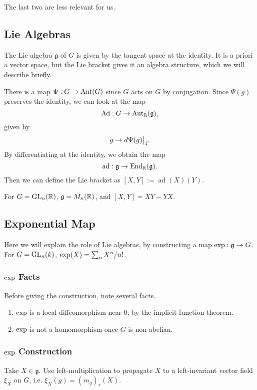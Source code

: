 The last two are less relevant for us.

\subsection{Lie Algebras}
The Lie algebra $\mathfrak{g}$ of $G$ is given by the tangent space at the 
identity. It is a priori a vector space, but the Lie bracket gives it an algebra
structure, which we will describe briefly.

There is a map $\Psi: G \rightarrow \operatorname{Aut}(G)$ since $G$ acts on $G$ by 
conjugation. Since $\Psi(g)$ preserves the identity, we can look at the map
\[ \operatorname{Ad}: G \rightarrow \operatorname{Aut}_{\mathbb{R}}(\mathfrak{g}), \]
given by \[ g \rightarrow \restr{d\Psi(g)}{1}.\] By differentiating at the 
identity, we obtain the map
\[ \operatorname{ad}: \mathfrak{g} \rightarrow \operatorname{End}_{\mathbb{R}}(\mathfrak{g}). \]
Then we can define the Lie bracket as $[X, Y] := \operatorname{ad}(X)(Y)$.

\begin{exmpl}
For $G = \mathrm{GL}_{n}({\mathbb{R}})$, $\mathfrak{g} = M_n(\mathbb{R})$, and $[X, Y] = XY - YX$.
\end{exmpl}

\subsection{Exponential Map}

Here we will explain the role of Lie algebras, by constructing a map
$\operatorname{exp} : \mathfrak{g} \rightarrow G$. For $G = \mathrm{GL}_{n}({k})$,
$\operatorname{exp}(X) = \sum_n X^n / n!$.

\subsubsection{$\operatorname{exp}$ Facts} Before giving the construction, note several
facts.

\begin{enumerate}[1.]
\item $\operatorname{exp}$ is a local diffeomorphism near 0, by the implicit function
theorem.
\item $\operatorname{exp}$ is not a homomorphism once $G$ is non-abelian.
\end{enumerate}

\subsubsection{$\operatorname{exp}$ Construction}
Take $X \in \mathfrak{g}$. Use left-multiplication to propagate $X$ to a
left-invariant vector field $\xi_X$ on $G$, i.e. $\xi_X(g) = (m_g)_*(X).$

